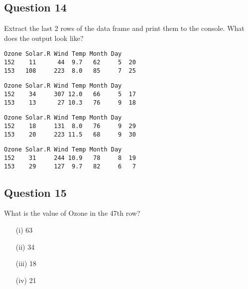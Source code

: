 \documentclass[12pt]{article}
\begin{document}
\newpage
\subsection*{Question 14}
\Large
Extract the last 2 rows of the data frame and print them to the console. What does the output look like?

\begin{framed}
	\begin{verbatim}
Ozone Solar.R Wind Temp Month Day
152    11      44  9.7   62     5  20
153   108     223  8.0   85     7  25
	\end{verbatim}
\end{framed}
\begin{framed}
	\begin{verbatim}
Ozone Solar.R Wind Temp Month Day
152    34     307 12.0   66     5  17
153    13      27 10.3   76     9  18
	\end{verbatim}
\end{framed}
\begin{framed}
	\begin{verbatim}
Ozone Solar.R Wind Temp Month Day
152    18     131  8.0   76     9  29
153    20     223 11.5   68     9  30
	\end{verbatim}
\end{framed}
\begin{framed}
	\begin{verbatim}
Ozone Solar.R Wind Temp Month Day
152    31     244 10.9   78     8  19
153    29     127  9.7   82     6   7
	\end{verbatim}
\end{framed}

\newpage
\subsection*{Question 15}
\Large
What is the value of Ozone in the 47th row?
\begin{itemize}
\item[(i)] 63
\item[(ii)] 34
\item[(iii)] 18
\item[(iv)] 21
\end{itemize}

\newpage
\end{document}
